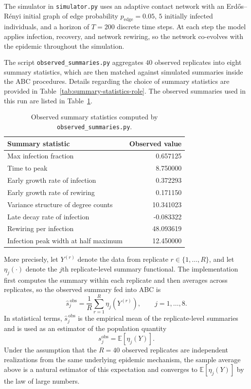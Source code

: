 \documentclass[11pt]{article}
\begin{document}
The simulator in \texttt{simulator.py} uses an adaptive contact network with an Erd\H{o}s--R\'enyi initial graph of edge probability $p_{\text{edge}}=0.05$, $5$ initially infected individuals, and a horizon of $T=200$ discrete time steps. At each step the model applies infection, recovery, and network rewiring, so the network co-evolves with the epidemic throughout the simulation.

The script \texttt{observed\_summaries.py} aggregates $40$ observed replicates into eight summary statistics, which are then matched against simulated summaries inside the ABC procedures. Details regarding the choice of summary statistics are provided in Table~\ref{tab:summary-statistics-role}. The observed summaries used in this run are listed in Table~\ref{tab:observed-summaries}.

\begin{table}[H]
\centering
\caption{Observed summary statistics computed by \texttt{observed\_summaries.py}.}
\label{tab:observed-summaries}
\begin{tabular}{>{\raggedright\arraybackslash}p{}r}
\toprule
Summary statistic & Observed value \\
\midrule
Max infection fraction & 0.657125 \\
Time to peak & 8.750000 \\
Early growth rate of infection & 0.372293 \\
Early growth rate of rewiring & 0.171150 \\
Variance structure of degree counts & 10.341023 \\
Late decay rate of infection & -0.083322 \\
Rewiring per infection & 48.093619 \\
Infection peak width at half maximum & 12.450000 \\
\bottomrule
\end{tabular}
\end{table}

More precisely, let $Y^{(r)}$ denote the data from replicate $r \in \{1,\dots,R\}$, and let $\eta_j(\cdot)$ denote the $j$th replicate-level summary functional. The implementation first computes the summary within each replicate and then averages across replicates, so the observed summary fed into ABC is
\[
\widehat{s}^{\,\mathrm{obs}}_j
= \frac{1}{R}\sum_{r=1}^{R} \eta_j\!\left(Y^{(r)}\right),
\qquad j=1,\dots,8.
\]
In statistical terms, $\widehat{s}^{\,\mathrm{obs}}_j$ is the empirical mean of the replicate-level summaries and is used as an estimator of the population quantity
\[
s_j^{\mathrm{obs}} = \mathbb{E}\!\left[\eta_j(Y)\right].
\]
Under the assumption that the $R=40$ observed replicates are independent realizations from the same underlying epidemic mechanism, the sample average above is a natural estimator of this expectation and converges to $\mathbb{E}[\eta_j(Y)]$ by the law of large numbers.
\end{document}
